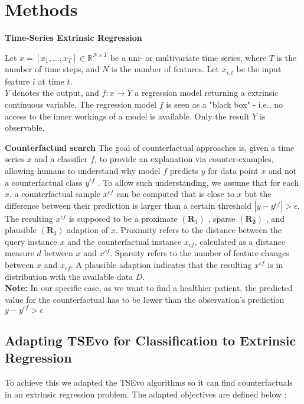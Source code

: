\section{Methods}
\label{sec:methods}
\textbf{Time-Series Extrinsic Regression}
\begin{definition}
Let $x=\left[x_{1}, \ldots, x_{T}\right] \in \mathbb{R}^{N \times T}$ be a uni- or multivariate time series, where $T$ is the number of time steps, and $N$ is the number of features.
Let $x_{i, t}$ be the input feature $i$ at time $t$.\\
$Y$ denotes the output, and $f: x \rightarrow Y$ a regression model returning a extrinsic continuous variable. The regression model $f$ is seen as a "black box" - i.e., no access to the inner workings of a model is available. Only the result $Y$ is observable.    
\end{definition}

\textbf{Counterfactual search} The goal of counterfactual approaches is, given a time series $x$ and a classifier $f$, to provide an explanation via counter-examples, allowing humans to understand why model $f$ predicts $y$ for data point $x$ and not a counterfactual class $y^{c f}$ \cite{wachter_counterfactual_2018}. To allow such understanding, we assume that for each $x$, a counterfactual sample $x^{c f}$ can be computed that is close to $x$ but the difference between their prediction is larger than a certain threshold $|y - y^{c f}| > \epsilon$. The resulting $x^{c f}$ is supposed to be a proximate $\left(\mathbf{R}_{1}\right)$ \cite{mothilal_explaining_2020}, sparse $\left(\mathbf{R}_{\mathbf{2}}\right)$ \cite{mothilal_explaining_2020}, and plausible $\left(\mathbf{R}_{3}\right)$ \cite{laugel_dangers_2019} adaption of $x$. Proximity refers to the distance between the query instance $x$ and the counterfactual instance $x_{c f}$, calculated as a distance measure $d$ between $x$ and $x^{c f}$. Sparsity refers to the number of feature changes between $x$ and $x_{c f}$. A plausible adaption indicates that the resulting $x^{c f}$ is in distribution with the available data $D$. \\

\textbf{Note:} In our specific case, as we want to find a healthier patient, the predicted value for the counterfactual has to be lower than the observation's prediction $y - y^{c f} > \epsilon$

\subsection{Adapting TSEvo for Classification to Extrinsic Regression}
To achieve this we adapted the TSEvo algorithms so it can find counterfactuals in an extrinsic regression problem.
The adapted objectives are defined below :


